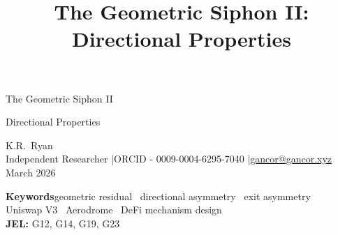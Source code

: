 \documentclass[11pt,a4paper]{article}
\title{The Geometric Siphon II: Directional Properties}
\theoremstyle{definition}
\begin{document}
\sloppy
\thispagestyle{plain}

\noindent\parbox[t][7.15cm][t]{\linewidth}{%
\begin{center}
{\fontsize{25pt}{29pt}\selectfont The Geometric Siphon II}\\[16pt]
{\fontsize{17pt}{18pt}\selectfont Directional Properties\strut}

\vspace{24pt}
{\large K.R.\ Ryan}\\[4pt]
{\fontsize{9pt}{11pt}\selectfont Independent Researcher \quad|\quad ORCID - 0009-0004-6295-7040 \quad|\quad \href{mailto:gancor@gancor.xyz}{gancor@gancor.xyz}}\\[4pt]
{\fontsize{9pt}{11pt}\selectfont March 2026}

\vspace{8pt}
{\fontsize{9pt}{11pt}\selectfont
\textbf{Keywords}\hspace{0.6em}geometric residual \textperiodcentered\ directional asymmetry \textperiodcentered\ exit asymmetry \\
Uniswap V3 \textperiodcentered\ Aerodrome \textperiodcentered\ DeFi mechanism design\\[4pt]
\textbf{JEL:} G12, G14, G19, G23}
\end{center}}

\vspace{-1pt}
\centerline{\scalebox{1.5}{$\therefore$}}
\vspace{14pt}
\end{document}
